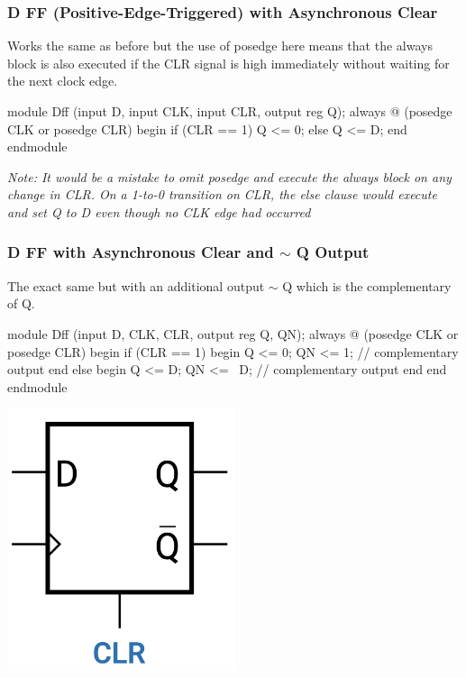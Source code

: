 \documentclass[12pt,openany]{book}
\begin{document}
\subsubsection{D FF (Positive-Edge-Triggered) with Asynchronous Clear}
Works the same as before but the use of posedge here means that the always block is also executed if the CLR signal is high immediately without waiting for the next clock edge.
\begin{vhdl}
module Dff (input D, input CLK, input CLR, output reg Q);
	always @ (posedge CLK or posedge CLR)
		begin
			if (CLR == 1)
				Q <= 0;
			else
				Q <= D;
		end
endmodule
\end{vhdl}
\textit{Note: It would be a mistake to omit posedge and execute the always block on any change in CLR. On a 1-to-0 transition on CLR, the else clause would execute and set Q to D even though no CLK edge had occurred}

\subsubsection{D FF with Asynchronous Clear and $\sim$ Q Output}
The exact same but with an additional output $\sim$ Q which is the complementary of Q.
\vspace*{5px}
\newline
\begin{minipage}{0.5\textwidth}

\begin{vhdl}
module Dff (input D, CLK, CLR, output reg Q, QN);
	always @ (posedge CLK or posedge CLR)
	begin
		if (CLR == 1) begin
			Q <= 0;
			QN <= 1; // complementary output
		end
		else begin
			Q <= D;
			QN <= ~D; // complementary output
		end
	end
endmodule	
\end{vhdl}
\end{minipage}
\hfill
\hspace*{-15px}
\vline
\hfill
\hspace*{-60px}
\begin{minipage}{0.40\textwidth}
	\begin{center}
		\includegraphics[width=0.5\textwidth]{circuits/12.4.3.png}
	\end{center}
\end{minipage}
\end{document}
